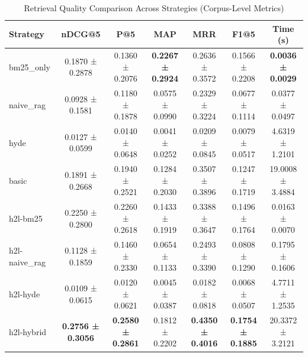 
\begin{table}[t]
\centering
\caption{Retrieval Quality Comparison Across Strategies (Corpus-Level Metrics)}
\label{tab:main_comparison}
\begin{tabular}{lcccccc}
\toprule
Strategy & nDCG@5 & P@5 & MAP & MRR & F1@5 & Time (s) \\
\midrule
bm25\_only & 0.1870 ± 0.2878 & 0.1360 ± 0.2076 & \textbf{0.2267 ± 0.2924} & 0.2636 ± 0.3572 & 0.1566 ± 0.2208 & \textbf{0.0036 ± 0.0029} \\
naive\_rag & 0.0928 ± 0.1581 & 0.1180 ± 0.1878 & 0.0575 ± 0.0990 & 0.2329 ± 0.3224 & 0.0677 ± 0.1114 & 0.0377 ± 0.0497 \\
hyde & 0.0127 ± 0.0599 & 0.0140 ± 0.0648 & 0.0041 ± 0.0252 & 0.0209 ± 0.0845 & 0.0079 ± 0.0517 & 4.6319 ± 1.2101 \\
basic & 0.1891 ± 0.2668 & 0.1940 ± 0.2521 & 0.1284 ± 0.2030 & 0.3507 ± 0.3896 & 0.1247 ± 0.1719 & 19.0008 ± 3.4884 \\
\midrule
h2l-bm25 & 0.2250 ± 0.2800 & 0.2260 ± 0.2618 & 0.1433 ± 0.1919 & 0.3388 ± 0.3647 & 0.1496 ± 0.1764 & 0.0163 ± 0.0070 \\
h2l-naive\_rag & 0.1128 ± 0.1859 & 0.1460 ± 0.2330 & 0.0654 ± 0.1133 & 0.2493 ± 0.3390 & 0.0808 ± 0.1290 & 0.1795 ± 0.1606 \\
h2l-hyde & 0.0109 ± 0.0615 & 0.0120 ± 0.0621 & 0.0045 ± 0.0387 & 0.0182 ± 0.0818 & 0.0068 ± 0.0507 & 4.7711 ± 1.2535 \\
h2l-hybrid & \textbf{0.2756 ± 0.3056} & \textbf{0.2580 ± 0.2861} & 0.1812 ± 0.2202 & \textbf{0.4350 ± 0.4016} & \textbf{0.1754 ± 0.1885} & 20.3372 ± 3.2121 \\
\bottomrule
\end{tabular}
\end{table}





